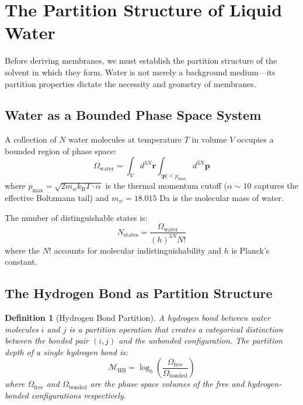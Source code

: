 \documentclass[twocolumn,10pt]{article}
\newtheorem{definition}[theorem]{Definition}
\theoremstyle{remark}
\newcommand{\kB}{k_{\mathrm{B}}}
\newcommand{\Depth}{\mathcal{M}}
\begin{document}
\section{The Partition Structure of Liquid Water}
\label{sec:water}

Before deriving membranes, we must establish the partition structure of the solvent in which they form. Water is not merely a background medium---its partition properties dictate the necessity and geometry of membranes.

\subsection{Water as a Bounded Phase Space System}

A collection of $N$ water molecules at temperature $T$ in volume $V$ occupies a bounded region of phase space:
\begin{equation}
    \Omega_{\text{water}} = \int_V d^{3N}\mathbf{r} \int_{|\mathbf{p}| < p_{\max}} d^{3N}\mathbf{p}
\end{equation}
where $p_{\max} = \sqrt{2m_w \kB T \cdot \alpha}$ is the thermal momentum cutoff ($\alpha \sim 10$ captures the effective Boltzmann tail) and $m_w = 18.015$ Da is the molecular mass of water.

The number of distinguishable states is:
\begin{equation}
    N_{\text{states}} = \frac{\Omega_{\text{water}}}{(h)^{3N} N!}
\end{equation}
where the $N!$ accounts for molecular indistinguishability and $h$ is Planck's constant.

\subsection{The Hydrogen Bond as Partition Structure}

\begin{definition}[Hydrogen Bond Partition]
\label{def:hbond}
A hydrogen bond between water molecules $i$ and $j$ is a partition operation that creates a categorical distinction between the bonded pair $(i,j)$ and the unbonded configuration. The partition depth of a single hydrogen bond is:
\begin{equation}
    \Depth_{\text{HB}} = \log_b\left(\frac{\Omega_{\text{free}}}{\Omega_{\text{bonded}}}\right)
\end{equation}
where $\Omega_{\text{free}}$ and $\Omega_{\text{bonded}}$ are the phase space volumes of the free and hydrogen-bonded configurations respectively.
\end{definition}
\end{document}
